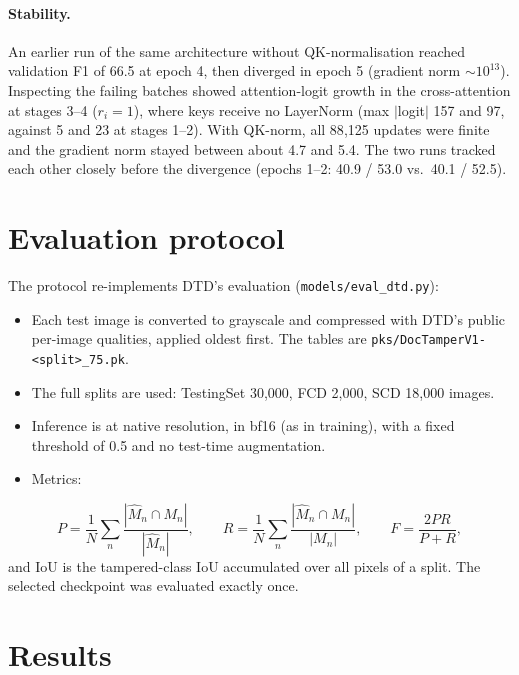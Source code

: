 \documentclass[10pt,a4paper]{article}
\begin{document}
\paragraph{Stability.} An earlier run of the same architecture without QK-normalisation
reached validation F1 of 66.5 at epoch 4, then diverged in epoch 5 (gradient norm
$\sim\!10^{13}$). Inspecting the failing batches showed attention-logit growth in the
cross-attention at stages 3--4 ($r_i=1$), where keys receive no LayerNorm (max $|$logit$|$
157 and 97, against 5 and 23 at stages 1--2). With QK-norm, all 88{,}125 updates were
finite and the gradient norm stayed between about 4.7 and 5.4. The two runs tracked each
other closely before the divergence (epochs 1--2: 40.9 / 53.0 vs.\ 40.1 / 52.5).

\section{Evaluation protocol}
The protocol re-implements DTD's evaluation (\texttt{models/eval\_dtd.py}):
\begin{itemize}
  \item Each test image is converted to grayscale and compressed with DTD's public
        per-image qualities, applied oldest first. The tables are
        \texttt{pks/DocTamperV1-}\allowbreak\texttt{<split>\_75.pk}.
  \item The full splits are used: TestingSet 30{,}000, FCD 2{,}000, SCD 18{,}000 images.
  \item Inference is at native resolution, in bf16 (as in training), with a fixed threshold
        of 0.5 and no test-time augmentation.
  \item Metrics:
\end{itemize}
\begin{equation}
P=\frac{1}{N}\sum_{n}\frac{|\hat M_n\cap M_n|}{|\hat M_n|},\qquad
R=\frac{1}{N}\sum_{n}\frac{|\hat M_n\cap M_n|}{|M_n|},\qquad
F=\frac{2PR}{P+R},
\end{equation}
\noindent and IoU is the tampered-class IoU accumulated over all pixels of a split.
The selected checkpoint was evaluated exactly once.

\section{Results}
\end{document}
